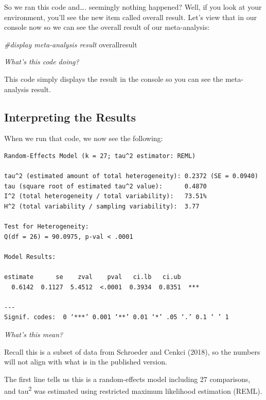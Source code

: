 \documentclass[
]{book}
\newenvironment{Shaded}{\begin{snugshade}}{\end{snugshade}}
\newcommand{\CommentTok}[1]{\textcolor[rgb]{0.56,0.35,0.01}{\textit{#1}}}
\newcommand{\NormalTok}[1]{#1}
\begin{document}
So we ran this code and\ldots. seemingly nothing happened? Well, if you look at your environment, you'll see the new item called overall result. Let's view that in our console now so we can see the overall result of our meta-analysis:

\begin{Shaded}
\begin{Highlighting}[]
\CommentTok{\#display meta{-}analysis result}
\NormalTok{overallresult}
\end{Highlighting}
\end{Shaded}

\emph{What's this code doing?}

This code simply displays the result in the console so you can see the meta-analysis result.

\hypertarget{interpreting-the-results}{%
\subsection{Interpreting the Results}\label{interpreting-the-results}}

When we run that code, we now see the following:

\begin{verbatim}
Random-Effects Model (k = 27; tau^2 estimator: REML)

tau^2 (estimated amount of total heterogeneity): 0.2372 (SE = 0.0940)
tau (square root of estimated tau^2 value):      0.4870
I^2 (total heterogeneity / total variability):   73.51%
H^2 (total variability / sampling variability):  3.77

Test for Heterogeneity:
Q(df = 26) = 90.0975, p-val < .0001

Model Results:

estimate      se    zval    pval   ci.lb   ci.ub      
  0.6142  0.1127  5.4512  <.0001  0.3934  0.8351  *** 

---
Signif. codes:  0 ‘***’ 0.001 ‘**’ 0.01 ‘*’ .05 ‘.’ 0.1 ‘ ’ 1
\end{verbatim}

\emph{What's this mean?}

Recall this is a subset of data from Schroeder and Cenkci (2018)\citep{schroeder2018}, so the numbers will not align with what is in the published version.

The first line tells us this is a random-effects model including 27 comparisons, and tau\textsuperscript{2} was estimated using restricted maximum likelihood estimation (REML).
\end{document}
